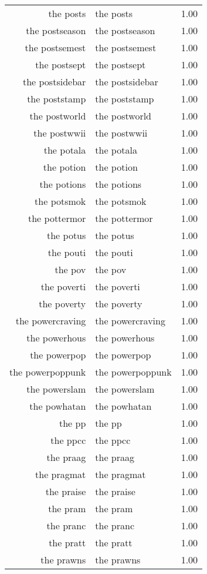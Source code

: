 \begin{table}[ht]
\begin{tabular}{rlr}
  the posts & the posts & 1.00 \\ 
  the postseason & the postseason & 1.00 \\ 
  the postsemest & the postsemest & 1.00 \\ 
  the postsept & the postsept & 1.00 \\ 
  the postsidebar & the postsidebar & 1.00 \\ 
  the poststamp & the poststamp & 1.00 \\ 
  the postworld & the postworld & 1.00 \\ 
  the postwwii & the postwwii & 1.00 \\ 
  the potala & the potala & 1.00 \\ 
  the potion & the potion & 1.00 \\ 
  the potions & the potions & 1.00 \\ 
  the potsmok & the potsmok & 1.00 \\ 
  the pottermor & the pottermor & 1.00 \\ 
  the potus & the potus & 1.00 \\ 
  the pouti & the pouti & 1.00 \\ 
  the pov & the pov & 1.00 \\ 
  the poverti & the poverti & 1.00 \\ 
  the poverty & the poverty & 1.00 \\ 
  the powercraving & the powercraving & 1.00 \\ 
  the powerhous & the powerhous & 1.00 \\ 
  the powerpop & the powerpop & 1.00 \\ 
  the powerpoppunk & the powerpoppunk & 1.00 \\ 
  the powerslam & the powerslam & 1.00 \\ 
  the powhatan & the powhatan & 1.00 \\ 
  the pp & the pp & 1.00 \\ 
  the ppcc & the ppcc & 1.00 \\ 
  the praag & the praag & 1.00 \\ 
  the pragmat & the pragmat & 1.00 \\ 
  the praise & the praise & 1.00 \\ 
  the pram & the pram & 1.00 \\ 
  the pranc & the pranc & 1.00 \\ 
  the pratt & the pratt & 1.00 \\ 
  the prawns & the prawns & 1.00 \\ 

\end{tabular}
\end{table}
